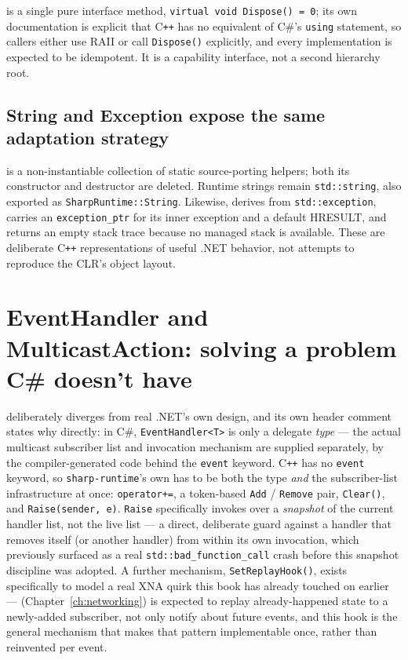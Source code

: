 is a single pure interface method,
\texttt{virtual void Dispose() = 0}; its own documentation is explicit that C\texttt{++} has
no equivalent of C\#'s \texttt{using} statement, so callers either use RAII or call
\texttt{Dispose()} explicitly, and every implementation is expected to be idempotent.
It is a capability interface, not a second hierarchy root.

\subsection{String and Exception expose the same adaptation strategy}

 is a non-instantiable collection of static source-porting helpers;
both its constructor and destructor are deleted. Runtime strings remain \texttt{std::string},
also exported as \texttt{SharpRuntime::String}. Likewise,
 derives from \texttt{std::exception}, carries an
\texttt{exception\_ptr} for its inner exception and a default HRESULT, and returns an empty
stack trace because no managed stack is available. These are deliberate C\texttt{++}
representations of useful .NET behavior, not attempts to reproduce the CLR's object layout.

\section{EventHandler and MulticastAction: solving a problem C\# doesn't have}

 deliberately diverges from real .NET's own
design, and its own header comment states why directly: in C\#, \texttt{EventHandler<T>} is
only a delegate \emph{type} --- the actual multicast subscriber list and invocation mechanism
are supplied separately, by the compiler-generated code behind the \texttt{event} keyword.
C\texttt{++} has no \texttt{event} keyword, so \texttt{sharp-runtime}'s own
 has to be both the type \emph{and} the subscriber-list
infrastructure at once: \texttt{operator+=}, a token-based \texttt{Add} / \texttt{Remove} pair,
\texttt{Clear()}, and \texttt{Raise(sender, e)}. \texttt{Raise} specifically invokes over a
\emph{snapshot} of the current handler list, not the live list --- a direct, deliberate guard
against a handler that removes itself (or another handler) from within its own invocation,
which previously surfaced as a real \texttt{std::bad\_function\_call} crash before this
snapshot discipline was adopted. A further mechanism, \texttt{SetReplayHook()}, exists
specifically to model a real XNA quirk this book has already touched on earlier ---
 (Chapter~\ref{ch:networking}) is expected to replay
already-happened state to a newly-added subscriber, not only notify about future events, and
this hook is the general mechanism that makes that pattern implementable once, rather than
reinvented per event.

